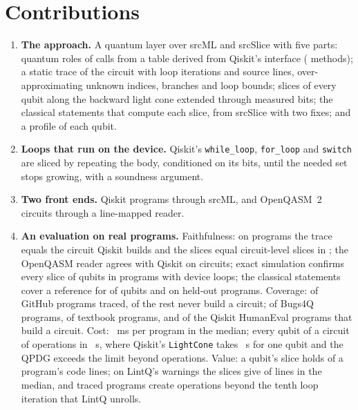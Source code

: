 \documentclass[10pt]{article}
\begin{document}
\section*{Contributions}
\begin{enumerate}
\item \textbf{The approach.} A quantum layer over srcML and srcSlice with five parts: quantum roles of calls from a
table derived from Qiskit's interface (\numToolGateTable{} methods); a static trace of the circuit with loop iterations
and source lines, over-approximating unknown indices, branches and loop bounds; slices of every qubit along the
backward light cone extended through measured bits; the classical statements that compute each slice, from srcSlice
with two fixes; and a profile of each qubit.
\item \textbf{Loops that run on the device.} Qiskit's \texttt{while\_loop}, \texttt{for\_loop} and \texttt{switch} are
sliced by repeating the body, conditioned on its bits, until the needed set stops growing, with a soundness argument.
\item \textbf{Two front ends.} Qiskit programs through srcML, and OpenQASM~2 circuits through a line-mapped reader.
\item \textbf{An evaluation on real programs.} Faithfulness: on \numToolDevPrograms{} programs the trace equals the
circuit Qiskit builds and the slices equal circuit-level slices in \numToolDevSliceEqual{}; the OpenQASM reader agrees
with Qiskit on \numQasmCircuitsChecked{} circuits; exact simulation confirms every slice of \numCfQubits{} qubits in
\numCfPrograms{} programs with device loops; the classical statements cover a reference for \numSsContainPct{} of
qubits and \numSsHeldContainPct{} on held-out programs. Coverage: \numScaleSOneSliced{} of \numScaleSOneFiles{} GitHub
programs traced, \numCovNoConstruction{} of the rest never build a circuit; \numSubjBugsTraced{} of
\numSubjBugsCount{} Bugs4Q programs, \numSubjTextTraced{} of \numSubjTextCount{} textbook programs, and
\numQheTracedOfBuildsPct{} of the Qiskit HumanEval programs that build a circuit. Cost: \numScaleSOneMedianMs{}~ms per
program in the median; every qubit of a circuit of \numScaleQbMaxOps{} operations in \numScaleQbAllS{}~s, where Qiskit's
\texttt{LightCone} takes \numScaleLcMaxS{}~s for one qubit and the QPDG exceeds the limit beyond
\numScaleQpdgMaxOps{} operations. Value: a qubit's slice holds \numScaleReadMedianPct{} of a program's code lines; on
LintQ's warnings the slices give \numLqReadMedian{} of \numLqCodeMedian{} lines in the median, and
\numLqBeyondTenFiles{} traced programs create operations beyond the tenth loop iteration that LintQ unrolls.
\end{enumerate}
\end{document}
